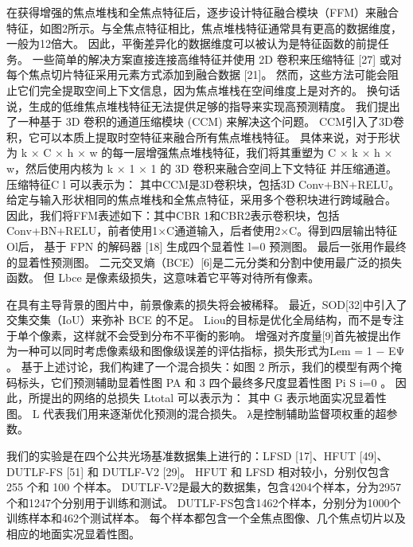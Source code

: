 \todo 

在获得增强的焦点堆栈和全焦点特征后，逐步设计特征融合模块（FFM）来融合特征，如图2所示。与全焦点特征相比，焦点堆栈特征通常具有更高的数据维度， 一般为12倍大。 因此，平衡差异化的数据维度可以被认为是特征函数的前提任务。
一些简单的解决方案直接连接高维特征并使用 2D 卷积来压缩特征 [27] 或对每个焦点切片特征采用元素方式添加到融合数据 [21]。 然而，这些方法可能会阻止它们完全提取空间上下文信息，因为焦点堆栈在空间维度上是对齐的。 换句话说，生成的低维焦点堆栈特征无法提供足够的指导来实现高预测精度。 我们提出了一种基于 3D 卷积的通道压缩模块 (CCM) 来解决这个问题。 CCM引入了3D卷积，它可以本质上提取时空特征来融合所有焦点堆栈特征。
具体来说，对于形状为 k × C × h × w 的每一层增强焦点堆栈特征，我们将其重塑为 C × k × h × w，然后使用内核为 k × 1 × 1 的 3D 卷积来融合空间上下文特征 并压缩通道。 压缩特征C l 可以表示为： 其中CCM是3D卷积块，包括3D Conv+BN+RELU。 给定与输入形状相同的焦点堆栈和全焦点特征，采用多个卷积块进行跨域融合。 因此，我们将FFM表述如下：其中CBR 1和CBR2表示卷积块，包括Conv+BN+RELU，前者使用1×C通道输入，后者使用2×C。得到四层输出特征Ol后， 基于 FPN 的解码器 [18] 生成四个显着性 l=0 预测图。 最后一张用作最终的显着性预测图。 二元交叉熵（BCE）[6]是二元分类和分割中使用最广泛的损失函数。 但 Lbce 是像素级损失，这意味着它平等对待所有像素。

在具有主导背景的图片中，前景像素的损失将会被稀释。 最近，SOD[32]中引入了交集交集（IoU）来弥补 BCE 的不足。
Liou的目标是优化全局结构，而不是专注于单个像素，这样就不会受到分布不平衡的影响。 增强对齐度量[9]首先被提出作为一种可以同时考虑像素级和图像级误差的评估指标，损失形式为Lem = 1 − EΨ 。 基于上述讨论，我们构建了一个混合损失：如图 2 所示，我们的模型有两个掩码标头，它们预测辅助显着性图 PA 和 { }3 四个最终多尺度显着性图 Pi S i=0 。 因此，所提出的网络的总损失 Ltotal 可以表示为： 其中 G 表示地面实况显着性图。 L 代表我们用来逐渐优化预测的混合损失。 λ是控制辅助监督项权重的超参数。


我们的实验是在四个公共光场基准数据集上进行的：LFSD [17]、HFUT [49]、DUTLF-FS [51] 和 DUTLF-V2 [29]。 HFUT 和 LFSD 相对较小，分别仅包含 255 个和 100 个样本。 DUTLF-V2是最大的数据集，包含4204个样本，分为2957个和1247个分别用于训练和测试。 DUTLF-FS包含1462个样本，分别分为1000个训练样本和462个测试样本。 每个样本都包含一个全焦点图像、几个焦点切片以及相应的地面实况显着性图。

